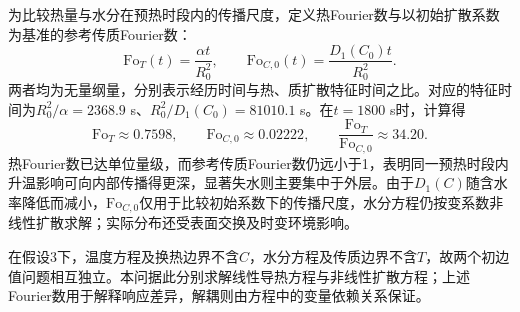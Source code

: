 为比较热量与水分在预热时段内的传播尺度，定义热Fourier数与以初始扩散系数为基准的参考传质Fourier数：
\begin{equation*}
\mathrm{Fo}_T(t)=\frac{\alpha t}{R_0^2},\qquad
\mathrm{Fo}_{C,0}(t)=\frac{D_1(C_0)t}{R_0^2}.
\end{equation*}
两者均为无量纲量，分别表示经历时间与热、质扩散特征时间之比。对应的特征时间为$R_0^2/\alpha=2368.9$ s、$R_0^2/D_1(C_0)=81010.1$ s。在$t=1800$ s时，计算得
\begin{equation*}
\mathrm{Fo}_T\approx0.7598,\qquad
\mathrm{Fo}_{C,0}\approx0.02222,\qquad
\frac{\mathrm{Fo}_T}{\mathrm{Fo}_{C,0}}\approx34.20.
\end{equation*}
热Fourier数已达单位量级，而参考传质Fourier数仍远小于1，表明同一预热时段内升温影响可向内部传播得更深，显著失水则主要集中于外层。由于$D_1(C)$随含水率降低而减小，$\mathrm{Fo}_{C,0}$仅用于比较初始系数下的传播尺度，水分方程仍按变系数非线性扩散求解；实际分布还受表面交换及时变环境影响。

在假设3下，温度方程及换热边界不含$C$，水分方程及传质边界不含$T$，故两个初边值问题相互独立。本问据此分别求解线性导热方程与非线性扩散方程；上述Fourier数用于解释响应差异，解耦则由方程中的变量依赖关系保证。

